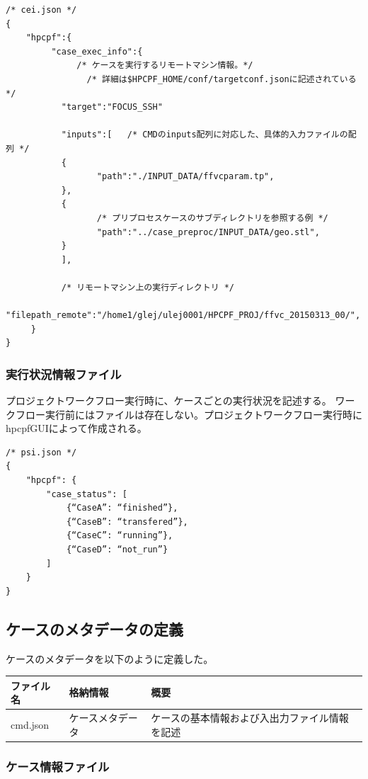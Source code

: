 \documentclass[a4paper,10pt,oneside]{jsbook}
\begin{document}
\begin{verbatim}
/* cei.json */
{
    "hpcpf":{
         "case_exec_info":{
         	  /* ケースを実行するリモートマシン情報。*/
	            /* 詳細は$HPCPF_HOME/conf/targetconf.jsonに記述されている */
           "target":"FOCUS_SSH"

           "inputs":[   /* CMDのinputs配列に対応した、具体的入力ファイルの配列 */
           {
                  "path":"./INPUT_DATA/ffvcparam.tp",
           },
           {
           	      /* プリプロセスケースのサブディレクトリを参照する例 */
                  "path":"../case_preproc/INPUT_DATA/geo.stl",
           }
           ],

           /* リモートマシン上の実行ディレクトリ */
           "filepath_remote":"/home1/glej/ulej0001/HPCPF_PROJ/ffvc_20150313_00/",
     }
}
\end{verbatim}

\subsubsection{実行状況情報ファイル}

プロジェクトワークフロー実行時に、ケースごとの実行状況を記述する。
ワークフロー実行前にはファイルは存在しない。プロジェクトワークフロー実行時に
hpcpfGUIによって作成される。

\begin{verbatim}
/* psi.json */
{
    "hpcpf": {
        "case_status": [
            {“CaseA”: “finished”},
            {“CaseB”: “transfered”},
            {“CaseC”: “running”},
            {“CaseD”: “not_run”}
        ]
    }
}
\end{verbatim}


\subsection{ケースのメタデータの定義}

ケースのメタデータを以下のように定義した。

\begin{table}[htb]
	\begin{tabular}{|l|l|l|} \hline
		ファイル名 & 格納情報 & 概要 \\\hline\hline
		cmd.json & ケースメタデータ & ケースの基本情報および入出力ファイル情報を記述 \\\hline
	\end{tabular}
\end{table}

\subsubsection{ケース情報ファイル}
\end{document}
